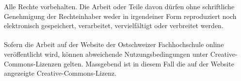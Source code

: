 \noindent\makebox[\linewidth]{\rule{\textwidth}{1pt}}
\begin{flushleft}
    \begin{small}
        Alle Rechte vorbehalten. Die Arbeit oder Teile davon dürfen ohne schriftliche Genehmigung der Rechteinhaber weder in irgendeiner Form reproduziert noch elektronisch gespeichert, verarbeitet, vervielfältigt oder verbreitet werden.\\~\\
        Sofern die Arbeit auf der Website der Ostschweizer Fachhochschule online veröffentlicht wird, können abweichende Nutzungsbedingungen unter Creative-Commons-Lizenzen gelten. Massgebend ist in diesem Fall die auf der Website angezeigte Creative-Commons-Lizenz.
    \end{small}
\end{flushleft}

\pagebreak
